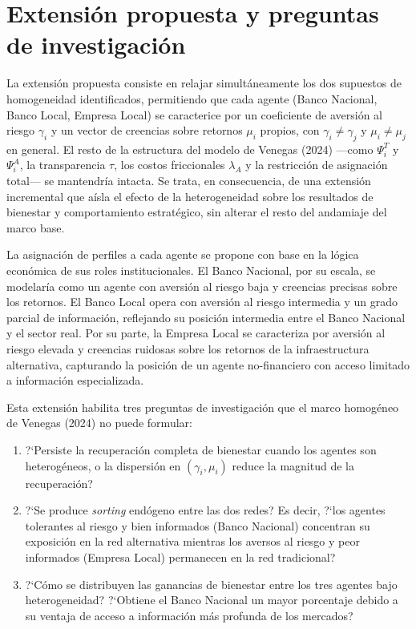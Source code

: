 \documentclass[12pt,a4paper]{article}
\begin{document}
\section{Extensión propuesta y preguntas de investigación}

La extensión propuesta consiste en relajar simultáneamente los dos supuestos de
homogeneidad identificados, permitiendo que cada agente (Banco Nacional, Banco Local,
Empresa Local) se caracterice por un coeficiente de aversión al riesgo $\gamma_i$ y un vector
de creencias sobre retornos $\mu_i$ propios, con $\gamma_i \neq \gamma_j$ y $\mu_i \neq \mu_j$
en general. El resto de la estructura del modelo de Venegas (2024) —como $\Psi_i^T$ y
$\Psi_i^A$, la transparencia $\tau$, los costos friccionales $\lambda_A$ y la restricción de
asignación total— se mantendría intacta. Se trata, en consecuencia, de una extensión
incremental que aísla el efecto de la heterogeneidad sobre los resultados de bienestar y
comportamiento estratégico, sin alterar el resto del andamiaje del marco base.

La asignación de perfiles a cada agente se propone con base en la lógica económica de sus
roles institucionales. El Banco Nacional, por su escala, se modelaría como un agente con
aversión al riesgo baja y creencias precisas sobre los retornos. El Banco Local opera con
aversión al riesgo intermedia y un grado parcial de información, reflejando su posición
intermedia entre el Banco Nacional y el sector real. Por su parte, la Empresa Local se
caracteriza por aversión al riesgo elevada y creencias ruidosas sobre los retornos de la
infraestructura alternativa, capturando la posición de un agente no-financiero con acceso
limitado a información especializada.

Esta extensión habilita tres preguntas de investigación que el marco homogéneo de Venegas
(2024) no puede formular:

\begin{enumerate}
    \item ?`Persiste la recuperación completa de bienestar cuando los agentes son heterogéneos,
    o la dispersión en $(\gamma_i, \mu_i)$ reduce la magnitud de la recuperación?

    \item ?`Se produce \textit{sorting} endógeno entre las dos redes? Es decir, ?`los agentes
    tolerantes al riesgo y bien informados (Banco Nacional) concentran su exposición en la red
    alternativa mientras los aversos al riesgo y peor informados (Empresa Local) permanecen
    en la red tradicional?

    \item ?`Cómo se distribuyen las ganancias de bienestar entre los tres agentes bajo
    heterogeneidad? ?`Obtiene el Banco Nacional un mayor porcentaje debido a su ventaja de
    acceso a información más profunda de los mercados?
\end{enumerate}
\end{document}
